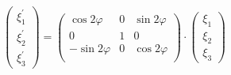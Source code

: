 \documentclass[12pt]{article}
\begin{document}
\begin{large}
\begin{equation*}
    \begin{pmatrix}
        \xi_1^{'} \\
        \xi_2^{'} \\
        \xi_3^{'}
    \end{pmatrix}
    =
    \begin{pmatrix}
        \cos 2 \varphi & 0 & \sin 2 \varphi \\
        0 & 1 & 0 \\
        -\sin 2 \varphi & 0 & \cos 2 \varphi \\
    \end{pmatrix}
    \cdot
    \begin{pmatrix}
        \xi_1 \\
        \xi_2 \\
        \xi_3
    \end{pmatrix}
\end{equation*}

\end{large}
\end{document}
